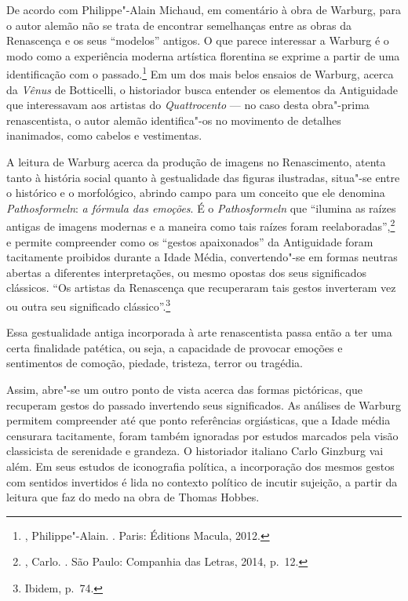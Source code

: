 De acordo com Philippe"-Alain Michaud, em comentário à obra de Warburg,
para o autor alemão não se trata de encontrar semelhanças entre as obras
da Renascença e os seus ``modelos'' antigos. O que parece interessar a Warburg é o modo como a experiência moderna artística florentina se exprime a partir de uma identificação com o passado.\footnote{, Philippe"-Alain. {}. Paris: Éditions Macula, 2012.}
Em um dos mais belos ensaios de Warburg, acerca da
\emph{Vênus} de Botticelli, o historiador busca entender os elementos da
Antiguidade que interessavam aos artistas do \emph{Quattrocento} --- no
caso desta obra"-prima renascentista, o autor alemão identifica"-os no
movimento de detalhes inanimados, como cabelos e vestimentas.

A leitura de Warburg acerca da produção de imagens no Renascimento,
atenta tanto à história social quanto à gestualidade das figuras
ilustradas, situa"-se entre o histórico e o morfológico, abrindo campo
para um conceito que ele denomina \emph{Pathosformeln}:
\emph{a fórmula das emoções}. É o \emph{Pathosformeln} que ``ilumina as
raízes antigas de imagens modernas e a maneira como tais raízes foram
reelaboradas'',\footnote{, Carlo. {}. São Paulo: Companhia das Letras, 2014, p.~12.} e permite compreender como os ``gestos apaixonados'' da Antiguidade foram
tacitamente proibidos durante a Idade Média, convertendo"-se em formas
neutras abertas a diferentes interpretações, ou mesmo opostas dos seus
significados clássicos. ``Os artistas da Renascença que recuperaram tais
gestos inverteram vez ou outra seu significado clássico''.\footnote{Ibidem, p.~74.}

Essa gestualidade antiga incorporada à arte renascentista passa então a
ter uma certa finalidade patética, ou seja, a capacidade de provocar
emoções e sentimentos de comoção, piedade, tristeza, terror ou tragédia.

Assim, abre"-se um outro ponto de vista acerca das formas pictóricas, que
recuperam gestos do passado invertendo seus significados. As análises de
Warburg permitem compreender até que ponto referências orgiásticas, que
a Idade média censurara tacitamente, foram também ignoradas por estudos
marcados pela visão classicista de serenidade e grandeza. O historiador
italiano Carlo Ginzburg vai além. Em seus estudos de iconografia
política, a incorporação dos mesmos gestos com sentidos invertidos é
lida no contexto político de incutir sujeição, a partir da leitura que
faz do medo na obra de Thomas Hobbes.

